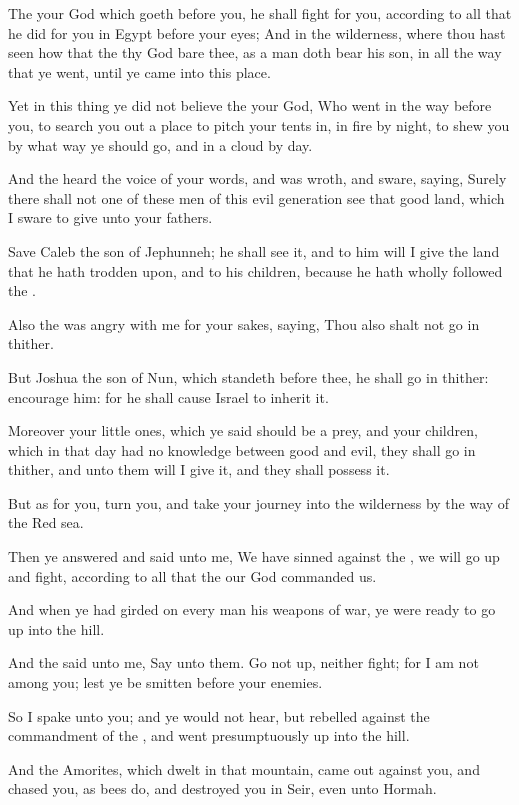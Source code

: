 \verse The \LORD your God which goeth before you, he shall fight for you, according to all that he did for you in Egypt before your eyes; \verse And in the wilderness, where thou hast seen how that the \LORD thy God bare thee, as a man doth bear his son, in all the way that ye went, until ye came into this place.

\verse Yet in this thing ye did not believe the \LORD your God, \verse Who went in the way before you, to search you out a place to pitch your tents in, in fire by night, to shew you by what way ye should go, and in a cloud by day.

\verse And the \LORD heard the voice of your words, and was wroth, and sware, saying, \verse Surely there shall not one of these men of this evil generation see that good land, which I sware to give unto your fathers.

\verse Save Caleb the son of Jephunneh; he shall see it, and to him will I give the land that he hath trodden upon, and to his children, because he hath wholly followed the \LORD.

\verse Also the \LORD was angry with me for your sakes, saying, Thou also shalt not go in thither.

\verse But Joshua the son of Nun, which standeth before thee, he shall go in thither: encourage him: for he shall cause Israel to inherit it.

\verse Moreover your little ones, which ye said should be a prey, and your children, which in that day had no knowledge between good and evil, they shall go in thither, and unto them will I give it, and they shall possess it.

\verse But as for you, turn you, and take your journey into the wilderness by the way of the Red sea.

\verse Then ye answered and said unto me, We have sinned against the \LORD, we will go up and fight, according to all that the \LORD our God commanded us.

And when ye had girded on every man his weapons of war, ye were ready to go up into the hill.

\verse And the \LORD said unto me, Say unto them. Go not up, neither fight; for I am not among you; lest ye be smitten before your enemies.

\verse So I spake unto you; and ye would not hear, but rebelled against the commandment of the \LORD, and went presumptuously up into the hill.

\verse And the Amorites, which dwelt in that mountain, came out against you, and chased you, as bees do, and destroyed you in Seir, even unto Hormah.


